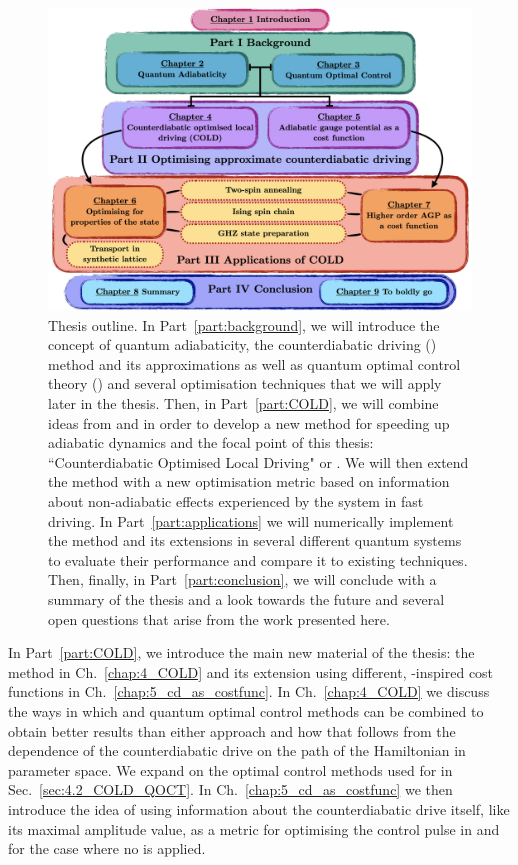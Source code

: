 \begin{figure}[t!]
    \centering
    \includegraphics[width=\linewidth]{images/thesis_overview.png} \caption[Thesis outline.]{Thesis outline. In Part~\ref{part:background}, we will introduce the concept of quantum adiabaticity, the counterdiabatic driving () method and its approximations as well as quantum optimal control theory () and several optimisation techniques that we will apply later in the thesis. Then, in Part~\ref{part:COLD}, we will combine ideas from  and  in order to develop a new method for speeding up adiabatic dynamics and the focal point of this thesis: ``Counterdiabatic Optimised Local Driving" or . We will then extend the method with a new optimisation metric based on information about non-adiabatic effects experienced by the system in fast driving. In Part~\ref{part:applications} we will numerically implement the  method and its extensions in several different quantum systems to evaluate their performance and compare it to existing techniques. Then, finally, in Part~\ref{part:conclusion}, we will conclude with a summary of the thesis and a look towards the future and several open questions that arise from the work presented here.}\label{fig:thesis_overview}
\end{figure}

In Part~\ref{part:COLD}, we introduce the main new material of the thesis: the  method in Ch.~\ref{chap:4_COLD} and its extension using different, -inspired cost functions in Ch.~\ref{chap:5_cd_as_costfunc}. In Ch.~\ref{chap:4_COLD} we discuss the ways in which  and quantum optimal control methods can be combined to obtain better results than either approach and how that follows from the dependence of the counterdiabatic drive on the path of the Hamiltonian in parameter space. We expand on the optimal control methods used for  in Sec.~\ref{sec:4.2_COLD_QOCT}. In Ch.~\ref{chap:5_cd_as_costfunc} we then introduce the idea of using information about the counterdiabatic drive itself, like its maximal amplitude value, as a metric for optimising the control pulse in  and for the case where no  is applied.

